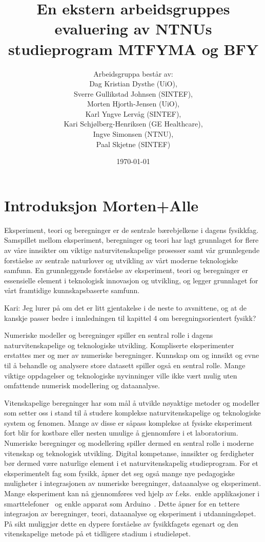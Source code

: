\documentclass{article}
\title{En ekstern arbeidsgruppes evaluering av NTNUs studieprogram MTFYMA og BFY}
\author{Arbeidsgruppa består av: \\ Dag Kristian Dysthe (UiO), \\ Sverre Gullikstad Johnsen (SINTEF), \\ Morten Hjorth-Jensen (UiO), \\ Karl Yngve Lervåg (SINTEF), \\ Kari Schjølberg-Henriksen (GE Healthcare), \\ Ingve Simonsen (NTNU), \\ Paal Skjetne (SINTEF)}
\date{\today}
\begin{document}
\maketitle
\tableofcontents

\begin{abstract}
\end{abstract}

\section{Introduksjon {\color{red} Morten+Alle}}
Eksperiment, teori og beregninger er de sentrale bærebjelkene i dagens fysikkfag. Samspillet mellom  eksperiment, beregninger og teori har lagt grunnlaget for flere av våre innsikter om  viktige naturvitenskapelige prosesser  samt vår grunnlegende forståelse av sentrale naturlover og utvikling av vårt moderne teknologiske samfunn.
En grunnleggende forståelse av eksperiment, teori og beregninger er essensielle element i teknologisk innovasjon og utvikling, og legger grunnlaget for vårt framtidige kunnskapsbaserte samfunn. 

{\color{red} Kari: Jeg lurer på om det er litt gjentakelse i de neste to avsnittene, og at de  kanskje passer bedre i innledningen til kapittel 4 om beregningsorientert fysikk?

Numeriske modeller og beregninger spiller en sentral rolle i dagens naturvitenskapelige og teknologiske utvikling. Kompliserte eksperimenter erstattes mer og mer av numeriske beregninger. Kunnskap om og innsikt og evne til å behandle og analysere store datasett spiller også en sentral rolle. Mange viktige oppdagelser og teknologiske nyvinninger ville ikke vært mulig uten omfattende numerisk modellering og dataanalyse.  

Vitenskapelige beregninger har som mål å utvikle nøyaktige metoder og modeller som setter oss i stand til å studere komplekse naturvitenskapelige og teknologiske system og fenomen. Mange av disse er såpass komplekse at fysiske eksperiment fort blir for kostbare eller nesten umulige å gjennomføre i et laboratorium. Numeriske beregninger og modellering spiller dermed en sentral rolle i moderne vitenskap og teknologisk utvikling. 
Digital kompetanse, innsikter og ferdigheter bør dermed være naturlige element i et naturvitenskapelig studieprogram. For et eksperimentelt fag som fysikk, åpner det seg også mange nye pedagogiske muligheter i integrasjonen av numeriske beregninger, dataanalyse og eksperiment. Mange eksperiment kan nå gjennomføres ved hjelp av f.eks.\ enkle applikasjoner i smarttelefoner~\cite{phyphox} og enkle apparat som Arduino~\cite{arduino}. Dette åpner for en tettere integrasjon av beregninger, teori, dataanalyse og eksperiment i utdanningsløpet. På sikt muliggjør dette en dypere forståelse av fysikkfagets egenart og den vitenskapelige metode på et tidligere stadium i studieløpet.}
\end{document}
